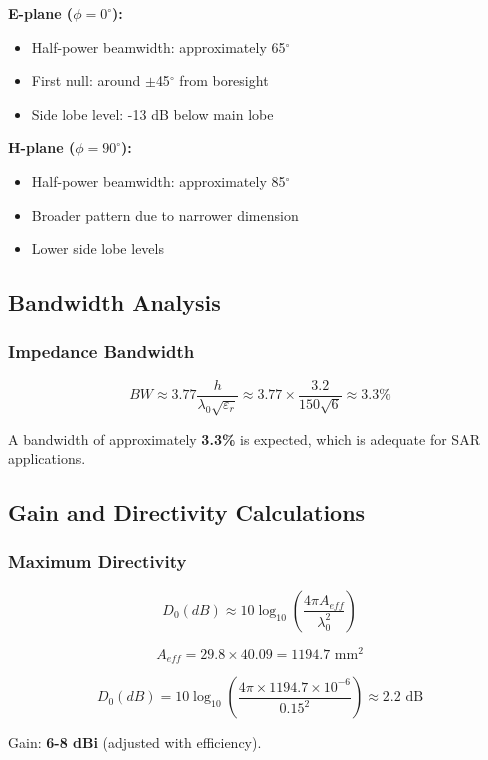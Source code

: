\documentclass[12pt]{article}
\begin{document}
\textbf{E-plane ($\phi = 0^\circ$):}
\begin{itemize}
    \item Half-power beamwidth: approximately 65$^\circ$
    \item First null: around $\pm$45$^\circ$ from boresight
    \item Side lobe level: -13 dB below main lobe
\end{itemize}

\textbf{H-plane ($\phi = 90^\circ$):}
\begin{itemize}
    \item Half-power beamwidth: approximately 85$^\circ$
    \item Broader pattern due to narrower dimension
    \item Lower side lobe levels
\end{itemize}

\subsection{Bandwidth Analysis}

\subsubsection{Impedance Bandwidth}

\[BW \approx 3.77\frac{h}{\lambda_0\sqrt{\varepsilon_r}} \approx 3.77 \times \frac{3.2}{150\sqrt{6}} \approx 3.3\%\]

A bandwidth of approximately \textbf{3.3\%} is expected, which is adequate for SAR applications.

\subsection{Gain and Directivity Calculations}

\subsubsection{Maximum Directivity}

\[D_0(dB) \approx 10\log_{10}\left(\frac{4\pi A_{eff}}{\lambda_0^2}\right)\]

\[A_{eff} = 29.8 \times 40.09 = 1194.7 \text{ mm}^2\]

\[D_0(dB) = 10\log_{10}\left(\frac{4\pi \times 1194.7 \times 10^{-6}}{0.15^2}\right) \approx 2.2 \text{ dB}\]

Gain: \textbf{6-8 dBi} (adjusted with efficiency).
\end{document}
